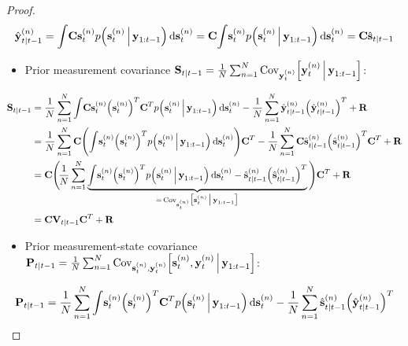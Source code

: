 \begin{proof}
\begin{align*}
				\hat{\boldsymbol{\mathrm{y}}}_{t \vert t - 1}^{(n)}
					= \int\! \boldsymbol{\mathrm{C}} \boldsymbol{\mathrm{s}}_t^{(n)} p\Big(\boldsymbol{\mathrm{s}}_t^{(n)} \,\Big\vert\, \boldsymbol{\mathrm{y}}_{1:t - 1}\Big) \dd{\boldsymbol{\mathrm{s}}_t^{(n)}}
					= \boldsymbol{\mathrm{C}} \! \int\! \boldsymbol{\mathrm{s}}_t^{(n)} p\Big(\boldsymbol{\mathrm{s}}_t^{(n)} \,\Big\vert\, \boldsymbol{\mathrm{y}}_{1:t - 1}\Big) \dd{\boldsymbol{\mathrm{s}}_t^{(n)}}
					= \boldsymbol{\mathrm{C}} \hat{\boldsymbol{\mathrm{s}}}_{t \vert t - 1}
			\end{align*}
			\begin{itemize}
				\item Prior measurement covariance \( \boldsymbol{\mathrm{S}}_{t \vert t - 1} = \frac{1}{N} \sum_{n = 1}^{N} \operatorname{Cov}_{\boldsymbol{\mathrm{y}}_t^{(n)}}\!\Big[\boldsymbol{\mathrm{y}}_t^{(n)} \,\Big\vert\, \boldsymbol{\mathrm{y}}_{1:t - 1}\Big] \):
			\end{itemize}
			\begin{align*}
				\boldsymbol{\mathrm{S}}_{t \vert t - 1}
					&= \frac{1}{N} \sum_{n = 1}^{N} \int\! \boldsymbol{\mathrm{C}} \boldsymbol{\mathrm{s}}_t^{(n)} \Big(\boldsymbol{\mathrm{s}}_t^{(n)}\Big)^T \boldsymbol{\mathrm{C}}^T p\Big(\boldsymbol{\mathrm{s}}_t^{(n)} \,\Big\vert\, \boldsymbol{\mathrm{y}}_{1:t - 1}\Big) \dd{\boldsymbol{\mathrm{s}}_t^{(n)}} - \frac{1}{N} \sum_{n = 1}^{N} \hat{\boldsymbol{\mathrm{y}}}_{t \vert t - 1}^{(n)} \Big( \hat{\boldsymbol{\mathrm{y}}}_{t \vert t - 1}^{(n)} \Big)^T + \boldsymbol{\mathrm{R}} \\
					&= \frac{1}{N} \sum_{n = 1}^{N} \boldsymbol{\mathrm{C}} \Bigg(\! \int\! \boldsymbol{\mathrm{s}}_t^{(n)} \Big(\boldsymbol{\mathrm{s}}_t^{(n)}\Big)^T p\Big(\boldsymbol{\mathrm{s}}_t^{(n)} \,\Big\vert\, \boldsymbol{\mathrm{y}}_{1:t - 1}\Big) \dd{\boldsymbol{\mathrm{s}}_t^{(n)}} \!\Bigg) \boldsymbol{\mathrm{C}}^T - \frac{1}{N} \sum_{n = 1}^{N} \boldsymbol{\mathrm{C}} \hat{\boldsymbol{\mathrm{s}}}_{t \vert t - 1}^{(n)} \Big( \hat{\boldsymbol{\mathrm{s}}}_{t \vert t - 1}^{(n)} \Big)^T \boldsymbol{\mathrm{C}}^T + \boldsymbol{\mathrm{R}} \\
					&= \boldsymbol{\mathrm{C}} \Bigg(\! \frac{1}{N} \sum_{n = 1}^{N} \underbrace{\int\! \boldsymbol{\mathrm{s}}_t^{(n)} \Big(\boldsymbol{\mathrm{s}}_t^{(n)}\Big)^T p\Big(\boldsymbol{\mathrm{s}}_t^{(n)} \,\Big\vert\, \boldsymbol{\mathrm{y}}_{1:t - 1}\Big) \dd{\boldsymbol{\mathrm{s}}_t^{(n)}} - \hat{\boldsymbol{\mathrm{s}}}_{t \vert t - 1}^{(n)} \Big( \hat{\boldsymbol{\mathrm{s}}}_{t \vert t - 1}^{(n)} \Big)^T}_{=\, \operatorname{Cov}_{\boldsymbol{\mathrm{s}}_t^{(n)}}\!\big[\boldsymbol{\mathrm{s}}_t^{(n)} \,\big\vert\, \boldsymbol{\mathrm{y}}_{1:t - 1}\big]} \Bigg) \boldsymbol{\mathrm{C}}^T + \boldsymbol{\mathrm{R}} \\
					&= \boldsymbol{\mathrm{C}} \boldsymbol{\mathrm{V}}_{t \vert t - 1} \boldsymbol{\mathrm{C}}^T + \boldsymbol{\mathrm{R}}
			\end{align*}
			\begin{itemize}
				\item Prior measurement-state covariance \( \boldsymbol{\mathrm{P}}_{t \vert t - 1} = \frac{1}{N} \sum_{n = 1}^{N} \operatorname{Cov}_{\boldsymbol{\mathrm{s}}_t^{(n)}, \boldsymbol{\mathrm{y}}_t^{(n)}}\!\Big[\boldsymbol{\mathrm{s}}_t^{(n)}, \boldsymbol{\mathrm{y}}_t^{(n)} \,\Big\vert\, \boldsymbol{\mathrm{y}}_{1:t - 1}\Big] \):
			\end{itemize}
			\begin{align*}
				\mat{P}_{t \subgiven t - 1}
					&= \frac{1}{N} \sum_{n = 1}^{N} \int\! \vec{s}_t^{(n)} \Big(\vec{s}_t^{(n)}\Big)^T \mat{C}^T p\Big(\vec{s}_t^{(n)} \Biggiven \vec{y}_{1:t - 1}\Big) \dd{\vec{s}_t^{(n)}} - \frac{1}{N} \sum_{n = 1}^{N} \hat{\vec{s}}_{t \subgiven t - 1}^{(n)} \Big(\hat{\vec{y}}_{t \subgiven t - 1}^{(n)}\Big)^T \\

\end{align*}
\end{proof}

